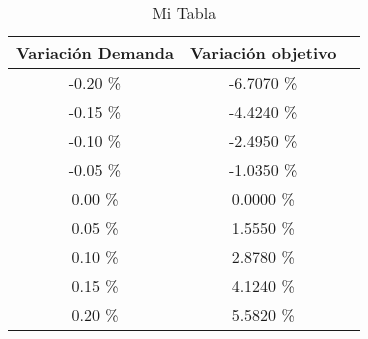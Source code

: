 \begin{table}
\centering
\begin{tabular}{|c|c|c|}
\hline
 Variación Demanda & Variación objetivo \\ \hline
-0.20 \% & -6.7070 \% \\ \hline
-0.15 \% & -4.4240 \% \\ \hline
-0.10 \% & -2.4950 \% \\ \hline
-0.05 \% & -1.0350 \% \\ \hline
0.00 \% & 0.0000 \% \\ \hline
0.05 \% & 1.5550 \% \\ \hline
0.10 \% & 2.8780 \% \\ \hline
0.15 \% & 4.1240 \% \\ \hline
0.20 \% & 5.5820 \% \\ \hline
\end{tabular}
\caption{Mi Tabla}
\end{table}

